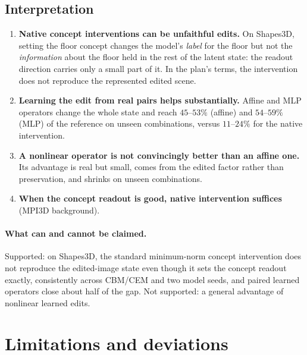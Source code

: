 \documentclass[11pt,a4paper]{article}
\begin{document}
\subsection{Interpretation}

\begin{enumerate}
\item \textbf{Native concept interventions can be unfaithful edits.} On Shapes3D, setting the floor concept changes
  the model's \emph{label} for the floor but not the \emph{information} about the floor held in the rest of the latent
  state: the readout direction carries only a small part of it. In the plan's terms, the intervention does not
  reproduce the represented edited scene.
\item \textbf{Learning the edit from real pairs helps substantially.} Affine and MLP operators change the whole state
  and reach $45$--$53\%$ (affine) and $54$--$59\%$ (MLP) of the reference on unseen combinations, versus
  $11$--$24\%$ for the native intervention.
\item \textbf{A nonlinear operator is not convincingly better than an affine one.} Its advantage is real but small,
  comes from the edited factor rather than preservation, and shrinks on unseen combinations.
\item \textbf{When the concept readout is good, native intervention suffices} (MPI3D background).
\end{enumerate}

\paragraph{What can and cannot be claimed.}
Supported: on Shapes3D, the standard minimum-norm concept intervention does not reproduce the edited-image state even
though it sets the concept readout exactly, consistently across CBM/CEM and two model seeds, and paired learned
operators close about half of the gap. Not supported: a general advantage of nonlinear learned edits.

\section{Limitations and deviations}
\label{sec:deviation}
\end{document}
